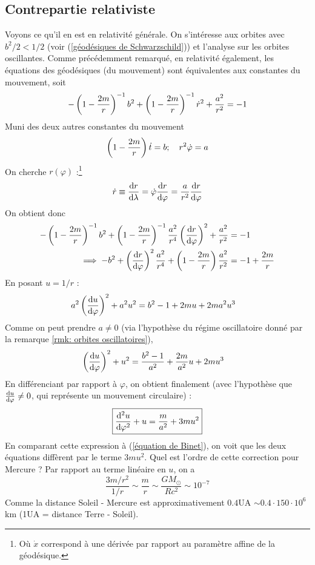 \subsection{Contrepartie relativiste}
Voyons ce qu'il en est en relativité générale. On s'intéresse aux orbites avec $b^2/2 <1/2$ (voir (\ref{géodésiques de Schwarzschild})) et l'analyse sur les orbites oscillantes. Comme précédemment remarqué, en relativité également, les équations des géodésiques (du mouvement) sont équivalentes aux constantes du mouvement, soit
\begin{equation}
    - \left( 1 - \frac{2m}{r} \right) ^{-1} b^2 + \left( 1-\frac{2m}{r} \right) ^{-1} \dot{r}^2 + \frac{a^2}{r^2} = - 1
\end{equation}
Muni des deux autres constantes du mouvement 
\begin{equation}
    \left( 1- \frac{2m}{r} \right) \dot{t} = b ; \quad r^2\dot{\varphi} = a
\end{equation}
On cherche $r(\varphi)$ :\footnote{Où $\dot{x}$ correspond à une dérivée par rapport au paramètre affine de la géodésique.}
\begin{equation}
    \dot{r} \equiv \frac{\mathrm{d} r}{\mathrm{d} \lambda}= \dot{\varphi} \frac{\mathrm{d} r}{ \mathrm{d} \varphi} =\frac{a}{r^2} \frac{\mathrm{d} r}{\mathrm{d} \varphi}
\end{equation}
On obtient donc
\begin{align}
    - \left( 1 - \frac{2m}{r} \right)^{-1} b^2 + \left( 1- \frac{2m}{r}\right)^{-1} \frac{a^2}{r^4} \left( \frac{\mathrm{d} r}{\mathrm{d} \varphi} \right)^2
    + \frac{a^2}{r^2} &= -1 \\
    \implies -b^2 + \left( \frac{\mathrm{d} r}{\mathrm{d} \varphi} \right)^2 \frac{a^2}{r^4} + \left( 1 - \frac{2m}{r} \right) \frac{a^2}{r^2} &= -1 + \frac{2m}{r}
 \end{align}
En posant $u = 1/r$ :
\begin{align}
     a^2\left( \frac{\mathrm{d} u}{\mathrm{d} \varphi} \right)^2  + a^2u^2 &= b^2 -1 + 2mu +2ma^2u^3
\end{align}
Comme on peut prendre $a\neq 0$ (via l'hypothèse du régime oscillatoire donné par la remarque \ref{rmk: orbites oscillatoires}), 
\begin{align}
     \left( \frac{\mathrm{d} u}{\mathrm{d} \varphi} \right)^2  + u^2 &= \frac{b^2 -1}{a^2} + \frac{2m}{a^2}u +2mu^3
\end{align}
En différenciant par rapport à $\varphi$, on obtient finalement (avec l'hypothèse que $\frac{\mathrm{d} u}{\mathrm{d} \varphi} \neq 0$, qui représente un mouvement circulaire) :
\begin{align}
    \label{équation de Binet RG}
    \boxed{\frac{\mathrm{d}^2 u}{\mathrm{d} \varphi^2} + u = \frac{m}{a^2} + 3m u^2}
\end{align}
En comparant cette expression à (\ref{équation de Binet}), on voit que les deux équations diffèrent par le terme $3mu^2$. Quel est l'ordre de cette correction pour Mercure ? Par rapport au terme linéaire en $u$, on a
\begin{equation}
    \frac{3m/r^2}{1/r} \sim \frac{m}{r} \sim \frac{GM_\odot}{Rc^2} \sim 10^{-7}
\end{equation}
Comme la distance Soleil - Mercure est approximativement $0.4$UA $\sim 0.4 \cdot 150 \cdot 10^6$km (1UA = distance Terre - Soleil).
